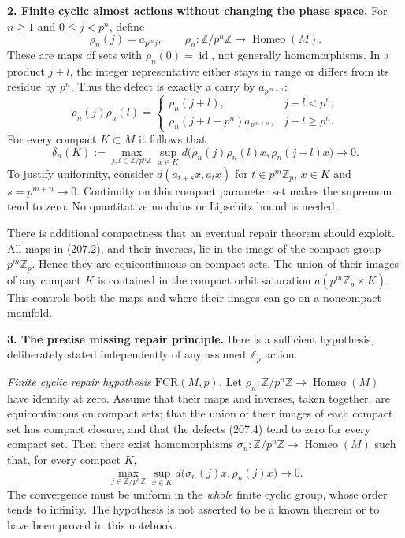 \documentclass[11pt,a4paper]{article}
\newcommand{\Z}{\mathbb{Z}}
\begin{document}
\textbf{2. Finite cyclic almost actions without changing the phase space.}
For $n\ge1$ and $0\le j<p^n$, define
\[
 \rho_n(j)=a_{p^m j},\qquad
 \rho_n:\Z/p^n\Z\longrightarrow\operatorname{Homeo}(M).
 \tag{207.2}
\]
These are maps of sets with $\rho_n(0)=\operatorname{id}$, not generally
homomorphisms. In a product $j+l$, the integer representative either
stays in range or differs from its residue by $p^n$. Thus the defect is
exactly a carry by $a_{p^{m+n}}$:
\[
 \rho_n(j)\rho_n(l)=
 \begin{cases}
  \rho_n(j+l),&j+l<p^n,\\
  \rho_n(j+l-p^n)a_{p^{m+n}},&j+l\ge p^n.
 \end{cases} \tag{207.3}
\]
For every compact $K\subset M$ it follows that
\[
 \delta_n(K):=
 \max_{j,l\in\Z/p^n\Z}\sup_{x\in K}
 d\bigl(\rho_n(j)\rho_n(l)x,\rho_n(j+l)x\bigr)
 \longrightarrow0. \tag{207.4}
\]
To justify uniformity, consider
$d(a_{t+s}x,a_t x)$ for $t\in p^m\Z_p$, $x\in K$ and
$s=p^{m+n}\to0$. Continuity on this compact parameter set makes the
supremum tend to zero. No quantitative modulus or Lipschitz bound is
needed.

There is additional compactness that an eventual repair theorem should
exploit. All maps in (207.2), and their inverses, lie in the image of the
compact group $p^m\Z_p$. Hence they are equicontinuous on compact sets.
The union of their images of any compact $K$ is contained in the compact
orbit saturation $a(p^m\Z_p\times K)$. This controls both the maps and
where their images can go on a noncompact manifold.

\textbf{3. The precise missing repair principle.}
Here is a sufficient hypothesis, deliberately stated independently of
any assumed $\Z_p$ action.

\emph{Finite cyclic repair hypothesis $\mathrm{FCR}(M,p)$.}
Let $\rho_n:\Z/p^n\Z\to\operatorname{Homeo}(M)$ have identity at zero.
Assume that their maps and inverses, taken together, are equicontinuous
on compact sets; that the union of their images of each compact set has
compact closure; and that the defects (207.4) tend to zero for every
compact set. Then there exist homomorphisms
$\sigma_n:\Z/p^n\Z\to\operatorname{Homeo}(M)$ such that, for every
compact $K$,
\[
 \max_{j\in\Z/p^n\Z}\sup_{x\in K}
 d\bigl(\sigma_n(j)x,\rho_n(j)x\bigr)\longrightarrow0.
 \tag{207.5}
\]
The convergence must be uniform in the \emph{whole} finite cyclic group,
whose order tends to infinity. The hypothesis is not asserted to be a
known theorem or to have been proved in this notebook.
\end{document}
